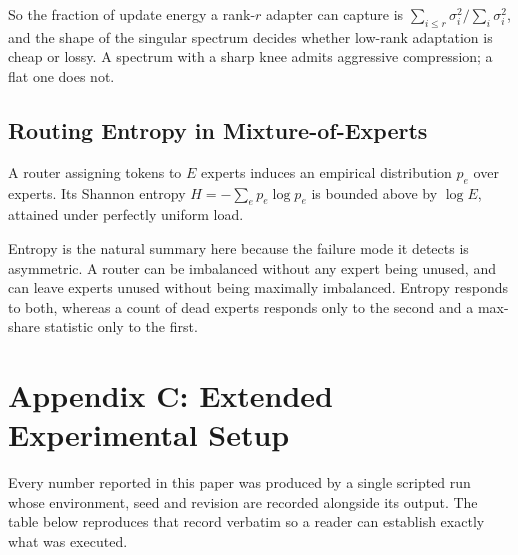 \documentclass[10pt,twocolumn,letterpaper]{article}
\begin{document}
So the fraction of update energy a rank-$r$ adapter can capture is $\sum_{i \le r} \sigma_i^2 / \sum_i \sigma_i^2$, and the shape of the singular spectrum decides whether low-rank adaptation is cheap or lossy. A spectrum with a sharp knee admits aggressive compression; a flat one does not.


\subsection{Routing Entropy in Mixture-of-Experts}


A router assigning tokens to $E$ experts induces an empirical distribution $p_e$ over experts. Its Shannon entropy $H = -\sum_e p_e \log p_e$ is bounded above by $\log E$, attained under perfectly uniform load.

Entropy is the natural summary here because the failure mode it detects is asymmetric. A router can be imbalanced without any expert being unused, and can leave experts unused without being maximally imbalanced. Entropy responds to both, whereas a count of dead experts responds only to the second and a max-share statistic only to the first.




\section{Appendix C: Extended Experimental Setup}


Every number reported in this paper was produced by a single scripted run whose environment, seed and revision are recorded alongside its output. The table below reproduces that record verbatim so a reader can establish exactly what was executed.
\begin{table}[htbp]
\centering
{}
\end{table}
\end{document}
